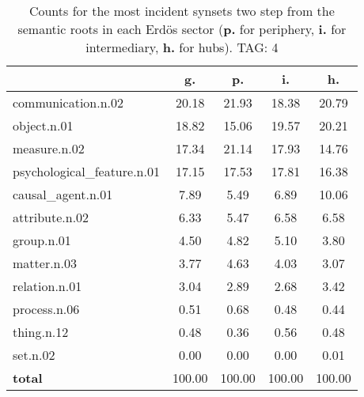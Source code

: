 \begin{table}[h!]
\begin{center}
\begin{tabular}{| l | c | c | c | c |}\hline
 & g. & p. & i. & h. \\\hline
communication.n.02 & 20.18  & 21.93  & 18.38  & 20.79 \\\hline
object.n.01 & 18.82  & 15.06  & 19.57  & 20.21 \\\hline
measure.n.02 & 17.34  & 21.14  & 17.93  & 14.76 \\\hline
psychological\_feature.n.01 & 17.15  & 17.53  & 17.81  & 16.38 \\\hline
causal\_agent.n.01 & 7.89  & 5.49  & 6.89  & 10.06 \\\hline
attribute.n.02 & 6.33  & 5.47  & 6.58  & 6.58 \\\hline
group.n.01 & 4.50  & 4.82  & 5.10  & 3.80 \\\hline
matter.n.03 & 3.77  & 4.63  & 4.03  & 3.07 \\\hline
relation.n.01 & 3.04  & 2.89  & 2.68  & 3.42 \\\hline
process.n.06 & 0.51  & 0.68  & 0.48  & 0.44 \\\hline
thing.n.12 & 0.48  & 0.36  & 0.56  & 0.48 \\\hline
set.n.02 & 0.00  & 0.00  & 0.00  & 0.01 \\\hline
{{\bf total}} & 100.00  & 100.00  & 100.00  & 100.00 \\\hline
\end{tabular}
\caption{Counts for the most incident synsets two step from the semantic roots in each Erd\"os sector ({\bf p.} for periphery, {\bf i.} for intermediary, {\bf h.} for hubs). TAG: 4}
\end{center}
\end{table}